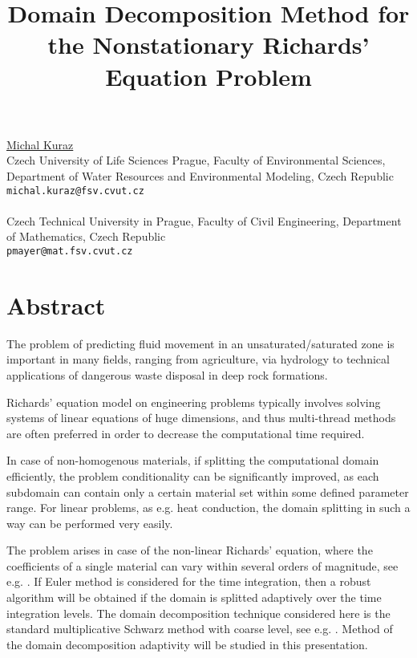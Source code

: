 \title{Domain Decomposition Method for the Nonstationary Richards' Equation Problem}
 \author{} \institute{}
\maketitle
\begin{center}
{\large \underline{Michal Kuraz}}\\
Czech University of Life Sciences Prague, Faculty of Environmental Sciences, Department of Water Resources and Environmental Modeling, Czech Republic\\
{\tt michal.kuraz@fsv.cvut.cz}
\\ \vspace{4mm}{\large Petr Mayer}\\
Czech Technical University in Prague, Faculty of Civil Engineering, Department of Mathematics, Czech Republic\\
{\tt pmayer@mat.fsv.cvut.cz}

\end{center}

\section*{Abstract}

The problem of predicting fluid movement in an unsaturated/saturated zone is important in many fields, ranging from agriculture, via hydrology to technical applications of dangerous waste disposal in deep rock formations.

  Richards' equation model on engineering problems typically involves solving systems of linear equations of  huge dimensions, and thus multi-thread methods are often preferred in order to decrease the computational time required. 
  
  In case of non-homogenous materials, if splitting the computational domain efficiently, the problem conditionality can be significantly improved, as  each subdomain can contain only a certain material set within some defined parameter range. For linear problems, as e.g. heat conduction, the domain splitting in such a way can be performed very easily.
  
  The problem arises in case of the non-linear Richards' equation, where the coefficients of a single material can vary within several orders of magnitude, see e.g. \cite{kuraz}. If Euler method is considered for the time integration, then a robust algorithm will be obtained if the domain is splitted adaptively over the time integration levels.
  The domain decomposition technique  considered here is the standard multiplicative Schwarz method with coarse level, see e.g. \cite{widlund}. Method of the domain decomposition adaptivity will be studied in this presentation.

